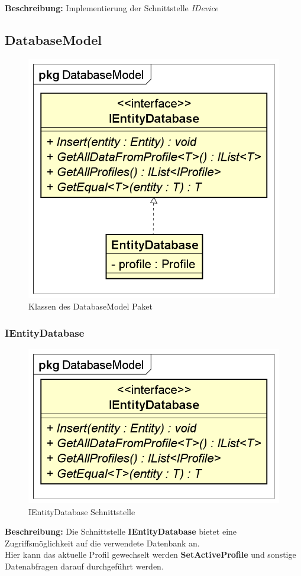 \documentclass[a4paper]{scrreprt}
\begin{document}
\textbf{Beschreibung:} Implementierung der Schnittstelle \textit{IDevice}


\subsection{DatabaseModel}
\begin{figure}[H]
\centering
\includegraphics[width=0.55\textheight]{graphics/Klassendiagramme/Model/DatabaseModelPackage.png}
\caption{Klassen des DatabaseModel Paket}
\end{figure}

\subsubsection{IEntityDatabase}
\begin{figure}[H]
\centering
\includegraphics[width=0.45\textheight]{graphics/Klassendiagramme/Model/IEntityDatabase.png}
\caption{IEntityDatabase Schnittstelle}
\end{figure}
\textbf{Beschreibung:} Die Schnittstelle \textbf{IEntityDatabase} bietet eine Zugriffsmöglichkeit auf die verwendete Datenbank an.\\
Hier kann das aktuelle Profil gewechselt werden \textbf{SetActiveProfile} und sonstige Datenabfragen darauf durchgeführt werden.
\end{document}
